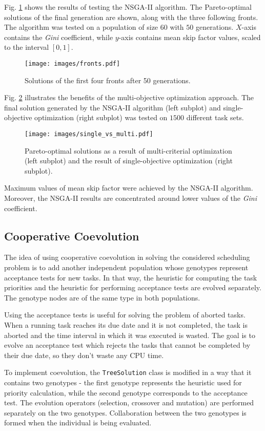 Fig. \ref{fronts} shows the results of testing the NSGA-II algorithm.
The Pareto-optimal solutions of the final generation are shown, along with the three following fronts.
The algorithm was tested on a population of size $60$ with $50$ generations.
$X$-axis contains the \textit{Gini} coefficient, while $y$-axis contains mean skip factor values, scaled to the interval $[0, 1]$.
\begin{figure}[ht]
    \centering
    \texttt{[image: images/fronts.pdf]}
    \caption{Solutions of the first four fronts after 50 generations.}
    \label{fronts}
\end{figure}

Fig. \ref{single_vs_multi} illustrates the benefits of the multi-objective optimization approach.
The final solution generated by the NSGA-II algorithm (left subplot) and single-objective optimization (right subplot) was tested on $1500$ different task sets.
\begin{figure}[ht]
    \centering
    \texttt{[image: images/single\_vs\_multi.pdf]}
    \caption{Pareto-optimal solutions as a result of multi-criterial optimization (left subplot) and the result of single-objective optimization (right subplot). }
    \label{single_vs_multi}
\end{figure}
Maximum values of mean skip factor were achieved by the NSGA-II algorithm.
Moreover, the NSGA-II results are concentrated around lower values of the \textit{Gini} coefficient.

\subsection{Cooperative Coevolution}
The idea of using cooperative coevolution in solving the considered scheduling problem is to add another independent population whose genotypes represent acceptance tests for new tasks.
In that way, the heuristic for computing the task priorities and the heuristic for performing acceptance tests are evolved separately.
The genotype nodes are of the same type in both populations.

Using the acceptance tests is useful for solving the problem of aborted tasks.
When a running task reaches its due date and it is not completed, the task is aborted and the time interval
in which it was executed is wasted.
The goal is to evolve an acceptance test which rejects the tasks that cannot be completed by their due date, so they don't waste any CPU time.

To implement coevolution, the \texttt{TreeSolution} class is modified in a way that it contains two genotypes - the first genotype represents the heuristic used for priority calculation, while the second genotype corresponds to the acceptance test. 
The evolution operators (selection, crossover and mutation) are performed separately on the two genotypes.
Collaboration between the two genotypes is formed when the individual is being evaluated.

